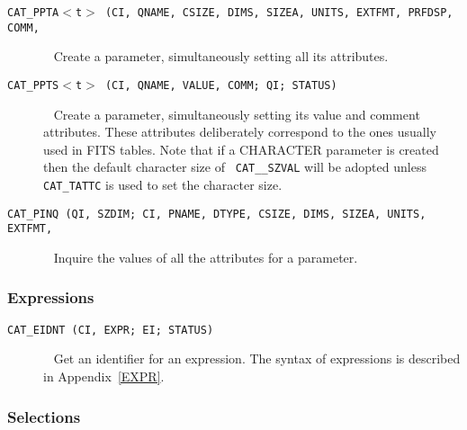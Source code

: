 \begin{description}

  \item[ {\tt CAT\_PPTA$<$t$>$ (CI, QNAME, CSIZE, DIMS, SIZEA, UNITS,
   EXTFMT, PRFDSP, COMM, } ] ~
  \newline Create a parameter, simultaneously setting all its
   attributes.

  \item[ {\tt CAT\_PPTS$<$t$>$ (CI, QNAME, VALUE, COMM; QI; STATUS)
   } ] ~
  \newline Create a parameter, simultaneously setting its value and
   comment attributes. These attributes deliberately correspond to the
   ones usually used in FITS tables. Note that if a CHARACTER
   parameter is created then the default character size of {\tt
   CAT\_\_SZVAL} will be adopted unless {\tt CAT\_TATTC} is used to set
   the character size.

  \item[ {\tt CAT\_PINQ (QI, SZDIM; CI, PNAME, DTYPE, CSIZE, DIMS,
   SIZEA, UNITS, EXTFMT, } ] ~
  \newline Inquire the values of all the attributes for a parameter.

\end{description}

\subsubsection{Expressions}

\begin{description}

  \item[ {\tt CAT\_EIDNT (CI, EXPR; EI; STATUS) } ] ~
  \newline Get an identifier for an expression. The syntax of
   expressions is described in Appendix~\ref{EXPR}.

\end{description}

\subsubsection{Selections}

